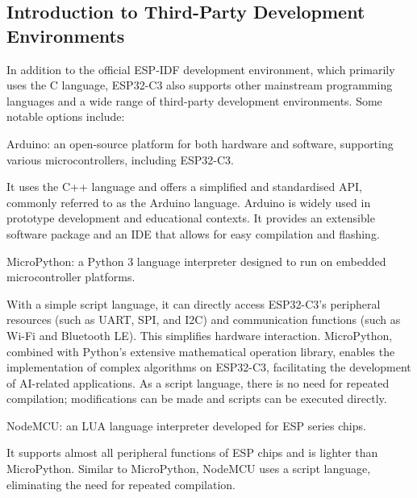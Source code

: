 \documentclass[a4paper,12pt]{book}
\begin{document}

\subsection{Introduction to Third-Party Development Environments}
In addition to the official ESP-IDF development environment, which primarily uses the C language, ESP32-C3 also supports other mainstream programming languages and a wide range of third-party development environments. Some notable options include:

\begin{term}{Arduino:}
    an open-source platform for both hardware and software, supporting various microcontrollers, including ESP32-C3.
    
    \vspace{6pt}
    It uses the C++ language and offers a simplified and standardised API, commonly referred to as the Arduino language. Arduino is widely used in prototype development and educational contexts. It provides an extensible software package and an IDE that allows for easy compilation and flashing.
\end{term}

\begin{term}{MicroPython:}
    a Python 3 language interpreter designed to run on embedded microcontroller platforms.
    
    \vspace{6pt}
    With a simple script language, it can directly access ESP32-C3’s peripheral resources (such as UART, SPI, and I2C) and communication functions (such as Wi-Fi and Bluetooth LE). This simplifies hardware interaction. MicroPython, combined with Python’s extensive mathematical operation library, enables the implementation of complex algorithms on ESP32-C3, facilitating the development of AI-related applications. As a script language, there is no need for repeated compilation; modifications can be made and scripts can be executed directly.
\end{term}

\begin{term}{NodeMCU:}
    an LUA language interpreter developed for ESP series chips.
    
    \vspace{6pt}
    It supports almost all peripheral functions of ESP chips and is lighter than MicroPython. Similar to MicroPython, NodeMCU uses a script language, eliminating the need for repeated compilation.
\end{term}
\end{document}
